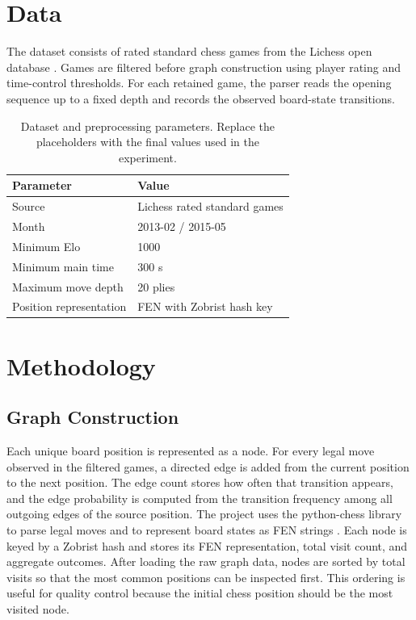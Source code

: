 \documentclass[11pt,a4paper]{article}
\begin{document}
\section{Data}

The dataset consists of rated standard chess games from the Lichess open database \citep{lichessDatabase}.
Games are filtered before graph construction using player rating and time-control thresholds.
For each retained game, the parser reads the opening sequence up to a fixed depth and records the observed board-state transitions.

\begin{table}[h]
  \centering
  \caption{Dataset and preprocessing parameters. Replace the placeholders with the final values used in the experiment.}
  \label{tab:data-parameters}
  \begin{tabular}{ll}
    \toprule
    Parameter & Value \\
    \midrule
    Source & Lichess rated standard games \\
    Month & 2013-02 / 2015-05 \\
    Minimum Elo & 1000 \\
    Minimum main time & 300 s \\
    Maximum move depth & 20 plies \\
    Position representation & FEN with Zobrist hash key \\
    \bottomrule
  \end{tabular}
\end{table}

\section{Methodology}

\subsection{Graph Construction}

Each unique board position is represented as a node.
For every legal move observed in the filtered games, a directed edge is added from the current position to the next position.
The edge count stores how often that transition appears, and the edge probability is computed from the transition frequency among all outgoing edges of the source position.
The project uses the python-chess library to parse legal moves and to represent board states as FEN strings \citep{pythonChess}.
Each node is keyed by a Zobrist hash and stores its FEN representation, total visit count, and aggregate outcomes.
After loading the raw graph data, nodes are sorted by total visits so that the most common positions can be inspected first.
This ordering is useful for quality control because the initial chess position should be the most visited node.
\end{document}
